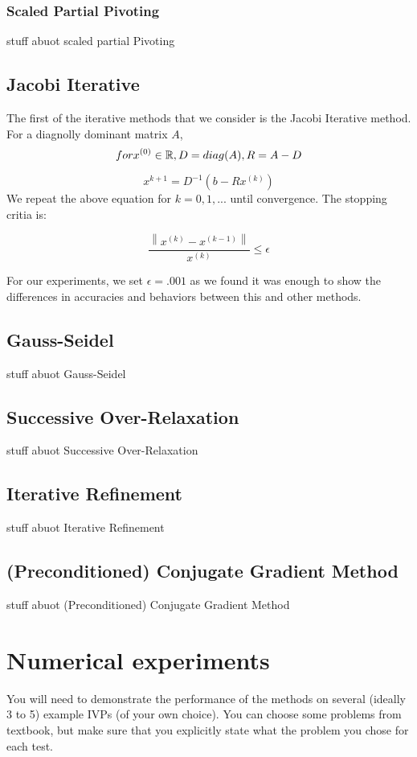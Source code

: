 \documentclass[11pt]{article}	%
\newcommand\norm[1]{\left\lVert#1\right\rVert}
\begin{document}
    \subsubsection{Scaled Partial Pivoting}
    stuff abuot scaled partial Pivoting


\subsection{Jacobi Iterative}
The first of the iterative methods that we consider is the Jacobi Iterative method. For a diagnolly dominant matrix $A$,
\begin{equation}\label{eq:jacobi-eq-1-qualifier}
    for    x^{(0)}\in {\Bbb R},   D = diag(A),    R = A - D
\end{equation}

\begin{equation}\label{eq:jacobi-eq-1}
    x^{k+1} = D^{-1}(b- Rx^{(k)})
\end{equation}
We repeat the above equation for $k = 0, 1, ...$ until convergence. The stopping critia is:

$$ \frac{\norm{x^{(k)} - x^{(k-1)}}}{x^{(k)}} \leq \epsilon $$

For our experiments, we set $\epsilon = .001$ as we found it was enough to show the differences in accuracies and behaviors between this and other methods.

\subsection{Gauss-Seidel}
stuff abuot Gauss-Seidel

\subsection{Successive Over-Relaxation}
stuff abuot Successive Over-Relaxation

\subsection{Iterative Refinement}
stuff abuot Iterative Refinement

\subsection{(Preconditioned) Conjugate Gradient Method}
stuff abuot (Preconditioned) Conjugate Gradient Method

\section{Numerical experiments}
You will need to demonstrate the performance
of the methods on several (ideally 3 to 5) example IVPs (of your own choice).
You can choose some problems from textbook, but make sure that you
explicitly state what the problem you chose for each test.
\end{document}

